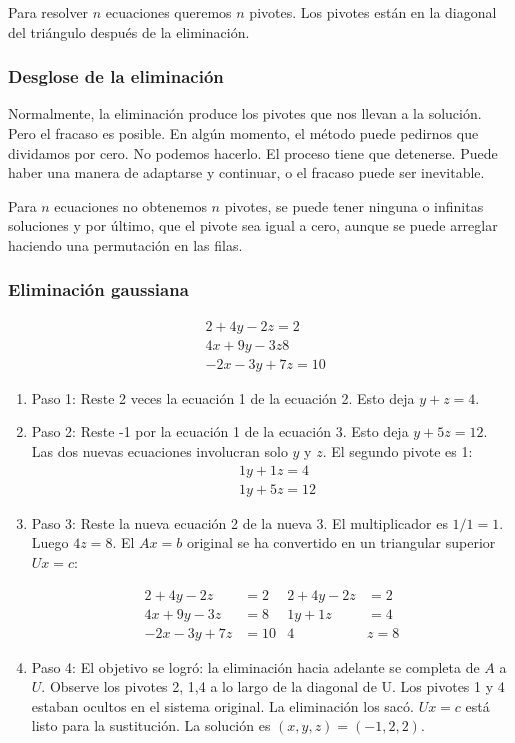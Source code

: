 Para resolver $n$ ecuaciones queremos $n$ pivotes. Los pivotes están en la diagonal del triángulo después de la eliminación.

\subsubsection{Desglose de la eliminación}

Normalmente, la eliminación produce los pivotes que nos llevan a la solución. Pero el fracaso es posible. En algún momento, el método puede pedirnos que dividamos por cero. No podemos hacerlo. El proceso
tiene que detenerse. Puede haber una manera de adaptarse y continuar, o el fracaso puede ser inevitable.

\begin{definition}[Fallas]
	Para $n$ ecuaciones no obtenemos $n$ pivotes, se puede tener ninguna o infinitas soluciones y por último, que el pivote sea igual a cero, aunque se puede arreglar haciendo una permutación en las filas.
\end{definition}

\subsubsection{Eliminación gaussiana}

\begin{align*}
	 & 2+4y-2z=2    \\
	 & 4x+9y-3z8    \\
	 & -2x-3y+7z=10
\end{align*}

\begin{enumerate}
	\item Paso 1: Reste 2 veces la ecuación 1 de la ecuación 2. Esto deja $y + z = 4.$
	\item Paso 2: Reste -1 por la ecuación 1 de la ecuación 3. Esto deja $y + 5z = 12$.
	      Las dos nuevas ecuaciones involucran solo $y$ y $z$. El segundo pivote es 1:
	      \begin{align*}
		       & 1y+1z=4  \\
		       & 1y+5z=12
	      \end{align*}

	\item Paso 3: Reste la nueva ecuación 2 de la nueva 3. El multiplicador es $1/1 = 1$. Luego $4z = 8$.
	      El $Ax = b$ original se ha convertido en un triangular superior $Ux=c$:

	      \begin{align*}
		      2+4y-2z   & =2  & 2+4y-2z & =2  \\
		      4x+9y-3z  & =8  & 1y+1z   & =4  \\
		      -2x-3y+7z & =10 & 4       & z=8
	      \end{align*}
	\item Paso 4: El objetivo se logró: la eliminación hacia adelante se completa de $A$ a $U$. Observe los pivotes
	      2, 1,4 a lo largo de la diagonal de U. Los pivotes 1 y 4 estaban ocultos en el sistema original.
	      La eliminación los sacó. $Ux = c$ está listo para la sustitución. La solución es $(x, y, z) = (-1,2,2)$.
\end{enumerate}

